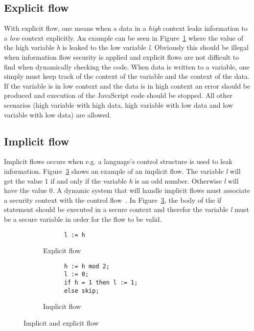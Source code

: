 \subsection{Explicit flow}
With explicit flow, one means when a data in a \emph{high} context leaks information to a \emph{low} context explicitly. An example can be seen in Figure~\ref{fig:expflow} where the value of the high variable \emph{h} is leaked to the low variable \emph{l}. Obviously this should be illegal when information flow security is applied and explicit flows are not difficult to find when dynamically checking the code. When data is written to a variable, one simply must keep track of the context of the variable and the context of the data. If the variable is in low context and the data is in high context an error should be produced and execution of the JavaScript code should be stopped. All other scenarios (high variable with high data, high variable with low data and low variable with low data) are allowed.
\subsection{Implicit flow}
\label{chapter:implicit_flow}
Implicit flows occurs when e.g. a language's control structure is used to leak information. Figure~\ref{fig:impflow} shows an example of an implicit flow. The variable \emph{l} will get the value 1 if and only if the variable \emph{h} is an odd number. Otherwise \emph{l} will have the value 0. A dynamic system that will handle implicit flows must associate a security context with the control flow~\cite{jsflow-csf12}. In Figure~\ref{fig:impflow}, the body of the if statement should be executed in a secure context and therefor the variable \emph{l} must be a secure variable in order for the flow to be valid.

\begin{figure}[h]
  \captionsetup[subfigure]{singlelinecheck=off,justification=raggedright}
  \begin{subfigure}[b]{0.5\textwidth}
    \begin{lstlisting}
      l := h
    \end{lstlisting}
    \caption{Explicit flow}
    \label{fig:expflow}
  \end{subfigure}
  \begin{subfigure}[b]{0.5\textwidth}
    \begin{lstlisting}
      h := h mod 2;
      l := 0;
      if h = 1 then l := 1;
      else skip;
    \end{lstlisting}
    \caption{Implicit flow}
    \label{fig:impflow}
  \end{subfigure}
  \caption{Implicit and explicit flow}
\end{figure}

